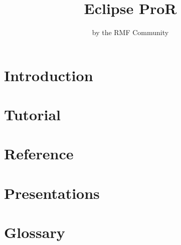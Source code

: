 \documentclass[twoside,10pt]{book}
\title{Eclipse ProR}
\author{by the RMF Community}
\begin{document}
        

\maketitle

\tableofcontents

\chapter{Introduction}


\chapter{Tutorial}


\chapter{Reference}


\chapter{Presentations}


\chapter{Glossary}

\end{document}
